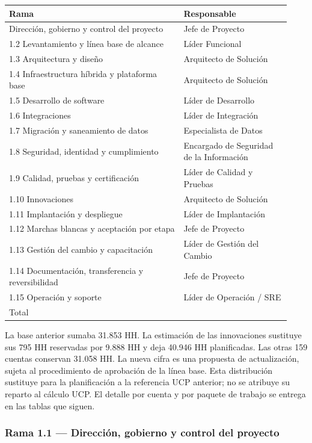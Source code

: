 \documentclass[11pt]{article}
\begin{document}
\begin{longtable}{@{}p{0.572\linewidth}p{0.358\linewidth}@{}}
\toprule
\textbf{Rama} & \textbf{Responsable} \\
\midrule
\endhead
\bottomrule
\endlastfoot
1.1 Dirección, gobierno y control del proyecto & Jefe de Proyecto \\
1.2 Levantamiento y línea base de alcance & Líder Funcional \\
1.3 Arquitectura y diseño & Arquitecto de Solución \\
1.4 Infraestructura híbrida y plataforma base & Arquitecto de Solución \\
1.5 Desarrollo de software & Líder de Desarrollo \\
1.6 Integraciones & Líder de Integración \\
1.7 Migración y saneamiento de datos & Especialista de Datos \\
1.8 Seguridad, identidad y cumplimiento & Encargado de Seguridad de la Información \\
1.9 Calidad, pruebas y certificación & Líder de Calidad y Pruebas \\
1.10 Innovaciones & Arquitecto de Solución \\
1.11 Implantación y despliegue & Líder de Implantación \\
1.12 Marchas blancas y aceptación por etapa & Jefe de Proyecto \\
1.13 Gestión del cambio y capacitación & Líder de Gestión del Cambio \\
1.14 Documentación, transferencia y reversibilidad & Jefe de Proyecto \\
1.15 Operación y soporte & Líder de Operación / SRE \\
Total &  \\
\end{longtable}

La base anterior sumaba 31.853 HH. La estimación de las innovaciones sustituye sus 795 HH reservadas por 9.888 HH y deja 40.946 HH planificadas. Las otras 159 cuentas conservan 31.058 HH. La nueva cifra es una propuesta de actualización, sujeta al procedimiento de aprobación de la línea base. Esta distribución sustituye para la planificación a la referencia UCP anterior; no se atribuye su reparto al cálculo UCP. El detalle por cuenta y por paquete de trabajo se entrega en las tablas que siguen.

\subsubsection{Rama 1.1 — Dirección, gobierno y control del proyecto}
\end{document}
